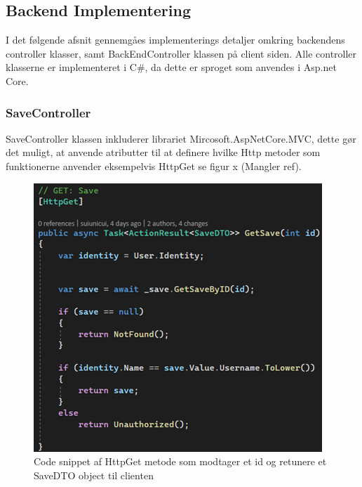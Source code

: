 \subsection{Backend Implementering}

I det følgende afsnit gennemgåes implementerings detaljer omkring backendens controller klasser, samt BackEndController klassen på client siden. Alle controller klasserne er implementeret i C\#, da dette er sproget som anvendes i Asp.net Core. \\

\subsubsection{SaveController}
SaveController klassen inkluderer librariet Mircosoft.AspNetCore.MVC, dette gør det muligt, at anvende atributter til at definere hvilke Http metoder som funktionerne anvender eksempelvis HttpGet se figur x (Mangler ref).\\


\begin{figure}[H]
\centering
\includegraphics[width = \textwidth]{02-Body/Images/Backend_Code_GetSave.PNG}
\caption{Code snippet af HttpGet metode som modtager et id og retunere et SaveDTO object til clienten}
\label{fig:Implementering-Backend-Code-GetSave}
\end{figure}


